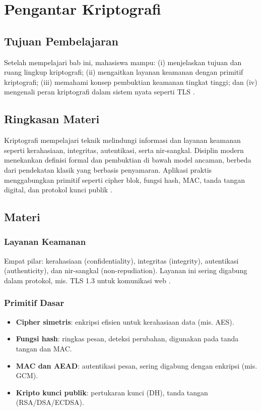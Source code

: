 \documentclass[../main.tex]{subfiles}
\begin{document}
\chapter{Pengantar Kriptografi}\label{ch:pengantar}
\section{Tujuan Pembelajaran}
Setelah mempelajari bab ini, mahasiswa mampu: (i) menjelaskan tujuan dan ruang lingkup kriptografi; (ii) mengaitkan layanan keamanan dengan primitif kriptografi; (iii) memahami konsep pembuktian keamanan tingkat tinggi; dan (iv) mengenali peran kriptografi dalam sistem nyata seperti TLS \citep{rfc8446}.

\section{Ringkasan Materi}
Kriptografi mempelajari teknik melindungi informasi dan layanan keamanan seperti kerahasiaan, integritas, autentikasi, serta nir-sangkal. Disiplin modern menekankan definisi formal dan pembuktian di bawah model ancaman, berbeda dari pendekatan klasik yang berbasis penyamaran. Aplikasi praktis menggabungkan primitif seperti cipher blok, fungsi hash, MAC, tanda tangan digital, dan protokol kunci publik \citep{bonehshoup,shannon1949}.

\section{Materi}
\subsection{Layanan Keamanan}
Empat pilar: kerahasiaan (confidentiality), integritas (integrity), autentikasi (authenticity), dan nir-sangkal (non-repudiation). Layanan ini sering digabung dalam protokol, mis. TLS 1.3 untuk komunikasi web \citep{rfc8446}.

\subsection{Primitif Dasar}
\begin{itemize}
  \item \textbf{Cipher simetris}: enkripsi efisien untuk kerahasiaan data (mis. AES). 
  \item \textbf{Fungsi hash}: ringkas pesan, deteksi perubahan, digunakan pada tanda tangan dan MAC.
  \item \textbf{MAC dan AEAD}: autentikasi pesan, sering digabung dengan enkripsi (mis. GCM).
  \item \textbf{Kripto kunci publik}: pertukaran kunci (DH), 
    tanda tangan (RSA/DSA/ECDSA).
\end{itemize}
\end{document}
